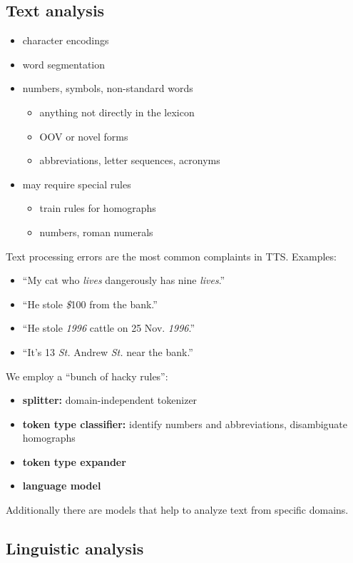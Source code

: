 \subsection{Text analysis}
\begin{itemize}
    \item character encodings
    \item word segmentation
    \item numbers, symbols, non-standard words
        \begin{itemize}
            \item anything not directly in the lexicon
            \item OOV or novel forms
            \item abbreviations, letter sequences, acronyms
        \end{itemize}
    \item may require special rules
        \begin{itemize}
            \item train rules for homographs
            \item numbers, roman numerals
        \end{itemize}
\end{itemize}
Text processing errors are the most common complaints in TTS. Examples:
\begin{itemize}
    \item ``My cat who \textit{lives} dangerously has nine \textit{lives}.''
    \item ``He stole \textit{\$}100 from the bank.''
    \item ``He stole \textit{1996} cattle on 25 Nov. \textit{1996}.''
    \item ``It's 13 \textit{St.} Andrew \textit{St.} near the bank.''
\end{itemize}
We employ a ``bunch of hacky rules'':
\begin{itemize}
    \item \textbf{splitter:} domain-independent tokenizer
    \item \textbf{token type classifier:} identify numbers and abbreviations, disambiguate homographs
    \item \textbf{token type expander}
    \item \textbf{language model}
\end{itemize}
Additionally there are models that help to analyze text from specific domains.

\subsection{Linguistic analysis}

